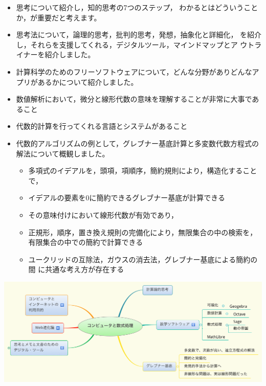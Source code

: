 \documentclass[dvipdfmx,11pat]{jarticle}
\begin{document}
\begin{itemize}
\item 思考について紹介し，知的思考の7つのステップ，
わかるとはどういうことか，が重要だと考えます。

\item 思考法について，論理的思考，批判的思考，発想，抽象化と詳細化，
を紹介し，それらを支援してくれる，デジタルツール，マインドマップとア
ウトライナーを紹介しました。

\item 計算科学のためのフリーソフトウェアについて，どんな分野がありどんなア
プリがあるかについて紹介しました。

\item 数値解析において，微分と線形代数の意味を理解することが非常に大事であること

\item 代数的計算を行ってくれる言語とシステムがあること

\item 代数的アルゴリズムの例として，グレブナー基底計算と多変数代数方程式の解法について概観しました。
\begin{itemize}
\item 多項式のイデアルを，頭項，項順序，簡約規則により，構造化することで，
\item イデアルの要素を0に簡約できるグレブナー基底が計算できる
\item その意味付けにおいて線形代数が有効であり，
\item 正規形，順序，置き換え規則の完備化により，無限集合の中の検索を，
有限集合の中での簡約で計算できる
\item ユークリッドの互除法，ガウスの消去法，グレブナー基底による簡約の間
に共通な考え方が存在する
\end{itemize}
\end{itemize}

\begin{center}
\includegraphics[width=18cm]{./map-images/01-computer_and_cal.png}
\end{center}
\end{document}
